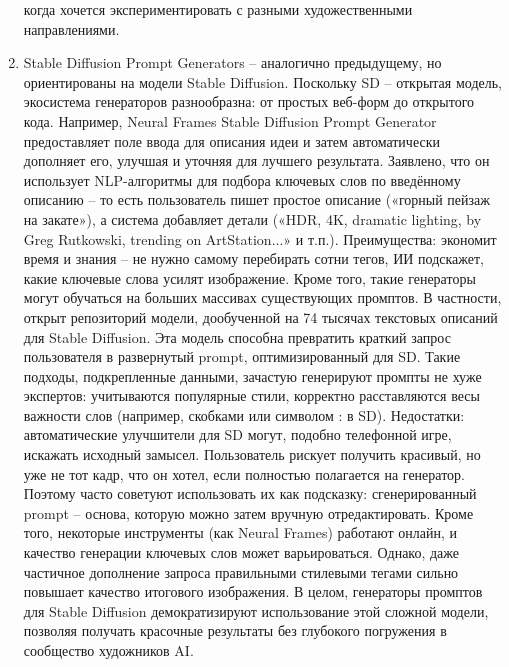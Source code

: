 \begin{enumerate}[label=\arabic*]
когда хочется экспериментировать с разными художественными направлениями.

\item Stable Diffusion Prompt Generators – аналогично предыдущему, но ориентированы на модели Stable Diffusion. Поскольку SD – открытая модель, экосистема генераторов разнообразна: от простых веб-форм до открытого кода. Например, Neural Frames Stable Diffusion Prompt Generator предоставляет поле ввода для описания идеи и затем автоматически дополняет его, улучшая и уточняя для лучшего результата\cite{neuralframes:sdprompt}.  Заявлено, что он использует NLP-алгоритмы для подбора ключевых слов по введённому описанию  – то есть пользователь пишет простое описание («горный пейзаж на закате»), а система добавляет детали («HDR, 4K, dramatic lighting, by Greg Rutkowski, trending on ArtStation...» и т.п.)\cite{feedough:sdprompt}. Преимущества: экономит время и знания – не нужно самому перебирать сотни тегов, ИИ подскажет, какие ключевые слова усилят изображение. Кроме того, такие генераторы могут обучаться на больших массивах существующих промптов. В частности, открыт репозиторий модели, дообученной на 74 тысячах текстовых описаний для Stable Diffusion\cite{ollama:sdprompt}. Эта модель способна превратить краткий запрос пользователя в развернутый prompt, оптимизированный для SD\cite{ollama:sdprompt}. Такие подходы, подкрепленные данными, зачастую генерируют промпты не хуже экспертов: учитываются популярные стили, корректно расставляются весы важности слов (например, скобками или символом : в SD). Недостатки: автоматические улучшители для SD могут, подобно телефонной игре, искажать исходный замысел. Пользователь рискует получить красивый, но уже не тот кадр, что он хотел, если полностью полагается на генератор. Поэтому часто советуют использовать их как подсказку: сгенерированный prompt – основа, которую можно затем вручную отредактировать. Кроме того, некоторые инструменты (как Neural Frames) работают онлайн, и качество генерации ключевых слов может варьироваться. Однако, даже частичное дополнение запроса правильными стилевыми тегами сильно повышает качество итогового изображения\cite{feedough:sdprompt}. В целом, генераторы промптов для Stable Diffusion демократизируют использование этой сложной модели, позволяя получать красочные результаты без глубокого погружения в сообщество художников AI.


\end{enumerate}
